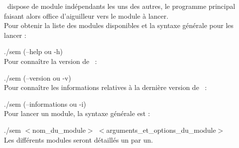 \documentclass[manual-fr.tex]{subfiles}
\begin{document}
\SEM\ dispose de module indépendants les uns des autres, le programme principal faisant alors office d'aiguilleur vers le module à lancer.\\

Pour obtenir la liste des modules disponibles et la syntaxe générale pour les lancer :

./sem (--help ou -h)\\

Pour connaître la version de \SEM\ :

./sem (--version ou -v)\\

Pour connaître les informations relatives à la dernière version de \SEM\ :

./sem (--informations ou -i)\\

Pour lancer un module, la syntaxe générale est :

./sem $<$nom\_du\_module$>$ $<$arguments\_et\_options\_du\_module$>$\\

Les différents modules seront détaillés un par un.

\end{document}
